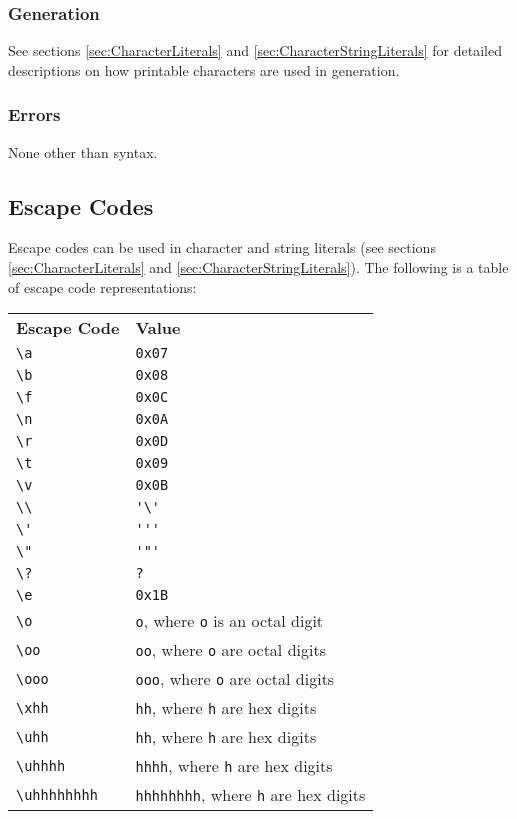 \documentclass[10pt,a4paper]{article}
\begin{document}
\subsubsection{Generation}
See sections \ref{sec:CharacterLiterals} and \ref{sec:CharacterStringLiterals} for detailed descriptions on how printable characters are used in generation.

\subsubsection{Errors}
None other than syntax.

\newpage




\subsection{Escape Codes}
\label{sec:EscapeCodes}
Escape codes can be used in character and string literals (see sections \ref{sec:CharacterLiterals} and \ref{sec:CharacterStringLiterals}). The following is a table of escape code representations: \newline
\begin{center}
\begin{tabular}{|l l|}
\hline
\textbf{Escape Code} & \textbf{Value} \\
\verb|\a| & \verb|0x07| \\
\verb|\b| & \verb|0x08| \\
\verb|\f| & \verb|0x0C| \\
\verb|\n| & \verb|0x0A| \\
\verb|\r| & \verb|0x0D| \\
\verb|\t| & \verb|0x09| \\
\verb|\v| & \verb|0x0B| \\
\verb|\\| & \verb|'\'| \\
\verb|\'| & \verb|'''| \\
\verb|\"| & \verb|'"'| \\
\verb|\?| & \verb|?| \\
\verb|\e| & \verb|0x1B| \\
\verb|\o| & \verb|o|, where \verb|o| is an octal digit \\
\verb|\oo| & \verb|oo|, where \verb|o| are octal digits \\
\verb|\ooo| & \verb|ooo|, where \verb|o| are octal digits \\
\verb|\xhh| & \verb|hh|, where \verb|h| are hex digits \\
\verb|\uhh| & \verb|hh|, where \verb|h| are hex digits \\
\verb|\uhhhh| & \verb|hhhh|, where \verb|h| are hex digits \\
\verb|\uhhhhhhhh| & \verb|hhhhhhhh|, where \verb|h| are hex digits \\
\hline
\end{tabular}
\end{center}
\end{document}
